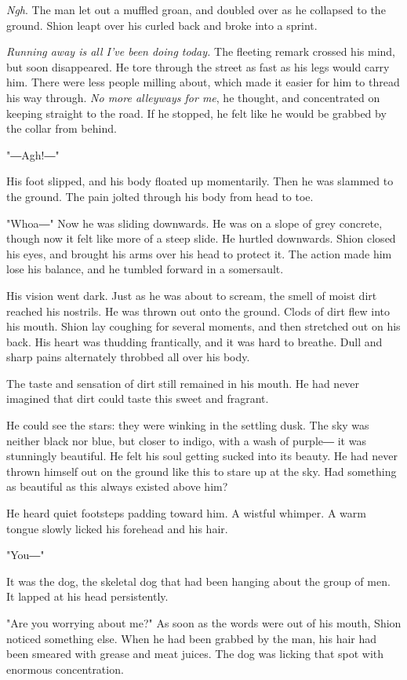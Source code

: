 \emph{Ngh}. The man let out a muffled groan, and doubled over as he collapsed
to the ground. Shion leapt over his curled back and broke into a sprint.

\emph{Running away is all I've been doing today.} The fleeting remark crossed
his mind, but soon disappeared. He tore through the street as fast as
his legs would carry him. There were less people milling about, which
made it easier for him to thread his way through. \emph{No more alleyways for
	me}, he thought, and concentrated on keeping straight to the road. If he
stopped, he felt like he would be grabbed by the collar from behind.

"―Agh!―"

His foot slipped, and his body floated up momentarily. Then he was
slammed to the ground. The pain jolted through his body from head to
toe.

"Whoa―" Now he was sliding downwards. He was on a slope of grey
concrete, though now it felt like more of a steep slide. He hurtled
downwards. Shion closed his eyes, and brought his arms over his head to
protect it. The action made him lose his balance, and he tumbled forward
in a somersault.

His vision went dark. Just as he was about to scream, the smell of moist
dirt reached his nostrils. He was thrown out onto the ground. Clods of
dirt flew into his mouth. Shion lay coughing for several moments, and
then stretched out on his back. His heart was thudding frantically, and
it was hard to breathe. Dull and sharp pains alternately throbbed all
over his body.

The taste and sensation of dirt still remained in his mouth. He had
never imagined that dirt could taste this sweet and fragrant.

He could see the stars: they were winking in the settling dusk. The sky
was neither black nor blue, but closer to indigo, with a wash of purple―
it was stunningly beautiful. He felt his soul getting sucked into its
beauty. He had never thrown himself out on the ground like this to stare
up at the sky. Had something as beautiful as this always existed above
him?

He heard quiet footsteps padding toward him. A wistful whimper. A warm
tongue slowly licked his forehead and his hair.

"You―"

It was the dog, the skeletal dog that had been hanging about the group
of men. It lapped at his head persistently.

"Are you worrying about me?" As soon as the words were out of his mouth,
Shion noticed something else. When he had been grabbed by the man, his
hair had been smeared with grease and meat juices. The dog was licking
that spot with enormous concentration.

